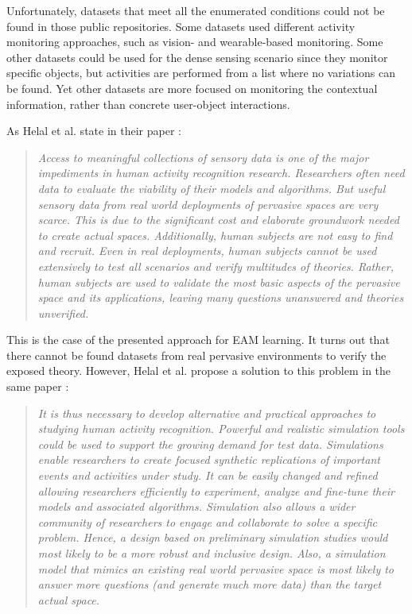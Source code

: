 Unfortunately, datasets that meet all the enumerated conditions could not be found in those public repositories. Some datasets used different activity monitoring approaches, such as vision- and wearable-based monitoring. Some other datasets could be used for the dense sensing scenario since they monitor specific objects, but activities are performed from a list where no variations can be found. Yet other datasets are more focused on monitoring the contextual information, rather than concrete user-object interactions.

As Helal et al. state in their paper \cite{Helal2011}:

\blockquote{\textit{Access to meaningful collections of sensory data is one of the major impediments in human activity recognition research. Researchers often need data to evaluate the viability of their models and algorithms. But useful sensory data from real world deployments of pervasive spaces are very scarce. This is due to the significant cost and elaborate groundwork needed to create actual spaces. Additionally, human subjects are not easy to find and recruit. Even in real deployments, human subjects cannot be used extensively to test all scenarios and verify multitudes of theories. Rather, human subjects are used to validate the most basic aspects of the pervasive space and its applications, leaving many questions unanswered and theories unverified.}}

This is the case of the presented approach for EAM learning. It turns out that there cannot be found datasets from real pervasive environments to verify the exposed theory. However, Helal et al. propose a solution to this problem in the same paper \cite{Helal2011}:

\blockquote{\textit{It is thus necessary to develop alternative and practical approaches to studying human activity recognition. Powerful and realistic simulation tools could be used to support the growing demand for test data. Simulations enable researchers to create focused synthetic replications of important events and activities under study. It can be easily changed and refined allowing researchers efficiently to experiment, analyze and fine-tune their models and associated algorithms. Simulation also allows a wider community of researchers to engage and collaborate to solve a specific problem. Hence, a design based on preliminary simulation studies would most likely to be a more robust and inclusive design. Also, a simulation model that mimics an existing real world pervasive space is most likely to answer more questions (and generate much more data) than the target actual space.}}

